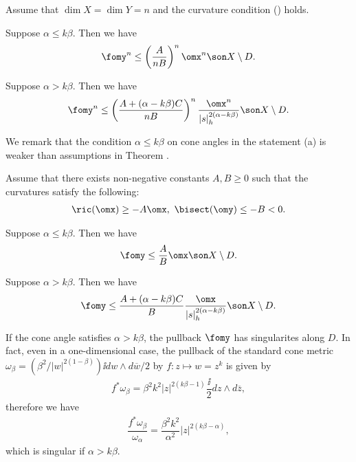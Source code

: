 \documentclass[12pt]{amsart}
\begin{document}
\begin{theorem}\label{VolThm}
Assume that $\dim X = \dim Y =n$ and the curvature condition () holds. 
\begin{enua}
	\item Suppose $\alpha \le k\beta $. Then we have 
	\begin{align*}
		\fomy^n \le \left( \dfrac{A}{nB} \right)^n \omx^n \son X\setminus D.
	\end{align*}
	\item Suppose $\alpha > k\beta $. Then we have 
			\begin{align*}
					\fomy^n \le \left( \dfrac{A+ (\alpha - k\beta ) C}{nB} \right)^n \dfrac{\omx^n}{|s|_h ^{2(\alpha -k\beta)}} \son X\setminus D.
			\end{align*}
\end{enua}
\end{theorem}

We remark that the condition $\alpha \le k\beta $ on cone angles in the statement (a) is weaker than assumptions in Theorem .
\begin{theorem}[Metrics]\label{TraceThm}
Assume that there exists non-negative constants $A, B\ge  0$ such that the curvatures satisfy the following: 
\begin{align}\label{CurvTrineq}
	\ric(\omx) \ge -A \omx, \ \bisect (\omy) \le -B <0 .
\end{align}
\begin{enua}
	\item Suppose $\alpha \le k\beta $. Then we have 
	\begin{align*}
		\fomy \le \dfrac{A}{B}\omx \son X\setminus D.
	\end{align*}
	\item Suppose $\alpha > k\beta $. Then we have 
		\begin{align*}
				\fomy \le  \dfrac{A+ (\alpha - k\beta ) C}{B}  \dfrac{\omx}{|s|_h ^{2(\alpha -k\beta)}} \son X\setminus D.
		\end{align*}
\end{enua}
\end{theorem}

If the cone angle satisfies $\alpha > k \beta$, the pullback $\fomy$ has singularites along $D$. 
In fact, even in a one-dimensional case, the pullback of the standard cone metric $\omega_\beta = (\beta^2 /|w|^{2(1-\beta )})\ii dw\wedge d\overline{w}/2$ by $f: z\mapsto w=z^k$ is given by
\begin{align*}
	f^\ast \omega_\beta = \beta^2 k^2 |z|^{2(k\beta-1)}\dfrac{\ii }{2} dz \wedge d\overline{z},
\end{align*}
therefore we have
\begin{align*}
	\dfrac{f^\ast \omega_\beta}{\omega_\alpha }= \dfrac{\beta^2 k^2}{\alpha^2 }|z|^{2(k\beta-\alpha )},
\end{align*}
which is singular if $\alpha > k \beta$. 
\end{document}
